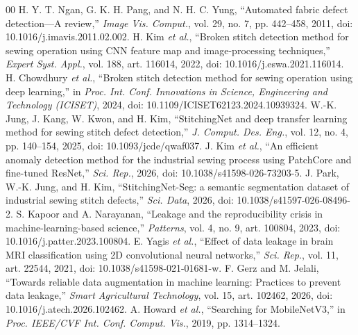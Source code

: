 \documentclass[conference,a4paper]{IEEEtran}
\begin{document}
\begin{thebibliography}{00}
 H. Y. T. Ngan, G. K. H. Pang, and N. H. C. Yung, ``Automated fabric defect detection---A review,'' \emph{Image Vis. Comput.}, vol. 29, no. 7, pp. 442--458, 2011, doi: 10.1016/j.imavis.2011.02.002.
 H. Kim \emph{et al.}, ``Broken stitch detection method for sewing operation using CNN feature map and image-processing techniques,'' \emph{Expert Syst. Appl.}, vol. 188, art. 116014, 2022, doi: 10.1016/j.eswa.2021.116014.
 H. Chowdhury \emph{et al.}, ``Broken stitch detection method for sewing operation using deep learning,'' in \emph{Proc. Int. Conf. Innovations in Science, Engineering and Technology (ICISET)}, 2024, doi: 10.1109/ICISET62123.2024.10939324.
 W.-K. Jung, J. Kang, W. Kwon, and H. Kim, ``StitchingNet and deep transfer learning method for sewing stitch defect detection,'' \emph{J. Comput. Des. Eng.}, vol. 12, no. 4, pp. 140--154, 2025, doi: 10.1093/jcde/qwaf037.
 J. Kim \emph{et al.}, ``An efficient anomaly detection method for the industrial sewing process using PatchCore and fine-tuned ResNet,'' \emph{Sci. Rep.}, 2026, doi: 10.1038/s41598-026-73203-5.
 J. Park, W.-K. Jung, and H. Kim, ``StitchingNet-Seg: a semantic segmentation dataset of industrial sewing stitch defects,'' \emph{Sci. Data}, 2026, doi: 10.1038/s41597-026-08496-2.
 S. Kapoor and A. Narayanan, ``Leakage and the reproducibility crisis in machine-learning-based science,'' \emph{Patterns}, vol. 4, no. 9, art. 100804, 2023, doi: 10.1016/j.patter.2023.100804.
 E. Yagis \emph{et al.}, ``Effect of data leakage in brain MRI classification using 2D convolutional neural networks,'' \emph{Sci. Rep.}, vol. 11, art. 22544, 2021, doi: 10.1038/s41598-021-01681-w.
 F. Gerz and M. Jelali, ``Towards reliable data augmentation in machine learning: Practices to prevent data leakage,'' \emph{Smart Agricultural Technology}, vol. 15, art. 102462, 2026, doi: 10.1016/j.atech.2026.102462.
 A. Howard \emph{et al.}, ``Searching for MobileNetV3,'' in \emph{Proc. IEEE/CVF Int. Conf. Comput. Vis.}, 2019, pp. 1314--1324.
\end{thebibliography}
\end{document}
